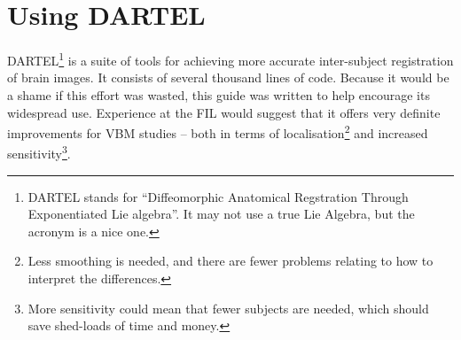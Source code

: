 \chapter{Using DARTEL \label{Chap:dartelguide}}

DARTEL\footnote{DARTEL stands for ``Diffeomorphic Anatomical Regstration Through Exponentiated Lie algebra''.
It may not use a true Lie Algebra, but the acronym is a nice one.} is a suite of tools for achieving more accurate inter-subject registration of brain images.
It consists of several thousand lines of code. Because it would be a shame if this effort was wasted, this guide was written to help encourage its widespread use.
Experience at the FIL would suggest that it offers very definite improvements for VBM studies -- both in terms of localisation\footnote{Less smoothing is needed, and there are fewer problems relating to how to interpret the differences.} and increased sensitivity\footnote{More sensitivity could mean that fewer subjects are needed, which should save shed-loads of time and money.}.



